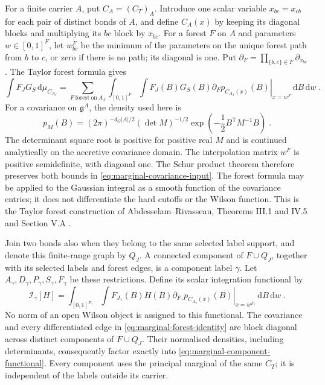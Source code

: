 \documentclass[11pt]{article}
\newcommand{\dd}{\mathrm{d}}
\begin{document}
For a finite carrier $A$, put $C_A=(C_T)_A$. Introduce one scalar variable $x_{bc}=x_{cb}$ for each pair of distinct bonds of $A$, and define $C_A(x)$ by keeping its diagonal blocks and multiplying its $bc$ block by $x_{bc}$. For a forest $F$ on $A$ and parameters $w\in [0,1]^F$, let $w^F_{bc}$ be the minimum of the parameters on the unique forest path from $b$ to $c$, or zero if there is no path; its diagonal is one. Put $\partial_F=\prod_{\{b,c\}\in F}\partial_{x_{bc}}$. The Taylor forest formula gives
\begin{equation}\label{eq:marginal-forest-identity}
    \int F_JG_S\,\dd\mu_{C_{A_J}}
        =\sum_{F\ \mathrm{forest\ on}\ A_J}
            \int_{[0,1]^F}\int F_J(B)G_S(B)
                \left.\partial_F p_{C_{A_J}(x)}(B)\right|_{x=w^F}
                    \,\dd B\,\dd w\;.
\end{equation}
For a covariance on $\mathfrak g^A$, the density used here is
\begin{equation}\label{eq:marginal-density-definition}
    p_M(B)=(2\pi)^{-d_G|A|/2}(\det M)^{-1/2}
        \exp\left(-\frac{1}{2}B^{\mathsf T}M^{-1}B\right)\;.
\end{equation}
The determinant square root is positive for positive real $M$ and is continued analytically on the accretive covariance domain. The interpolation matrix $w^F$ is positive semidefinite, with diagonal one. The Schur product theorem therefore preserves both bounds in \eqref{eq:marginal-covariance-input}. The forest formula may be applied to the Gaussian integral as a smooth function of the covariance entries; it does not differentiate the hard cutoffs or the Wilson function. This is the Taylor forest construction of Abdesselam--Rivasseau, Theorems III.1 and IV.5 and Section V.A \cite{AbdesselamRivasseau}.

Join two bonds also when they belong to the same selected label support, and denote this finite-range graph by $Q_J$. A connected component of $F\cup Q_J$, together with its selected labels and forest edges, is a component label $\gamma$. Let $A_\gamma,D_\gamma,P_\gamma,S_\gamma,F_\gamma$ be these restrictions. Define its scalar integration functional by
\begin{equation}\label{eq:marginal-component-functional}
    \mathcal I_\gamma[H]
        =\int_{[0,1]^{F_\gamma}}\int
            F_{J_\gamma}(B)H(B)
            \left.\partial_{F_\gamma}p_{C_{A_\gamma}(x)}(B)
            \right|_{x=w^{F_\gamma}}
                \,\dd B\,\dd w\;.
\end{equation}
No norm of an open Wilson object is assigned to this functional. The covariance and every differentiated edge in \eqref{eq:marginal-forest-identity} are block diagonal across distinct components of $F\cup Q_J$. Their normalised densities, including determinants, consequently factor exactly into \eqref{eq:marginal-component-functional}. Every component uses the principal marginal of the same $C_T$; it is independent of the labels outside its carrier.
\end{document}
